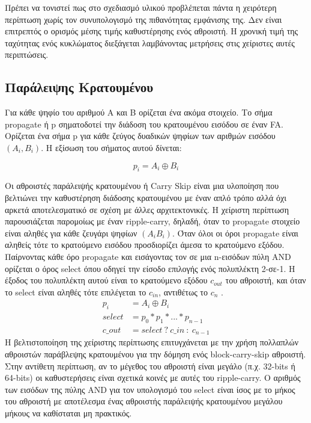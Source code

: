 Πρέπει να τονιστεί πως στο σχεδιασμό υλικού προβλέπεται πάντα η χειρότερη περίπτωση χωρίς τον συνυπολογισμό της πιθανότητας εμφάνισης της. Δεν είναι επιτρεπτός ο ορισμός μέσης τιμής καθυστέρησης ενός αθροιστή. Η χρονική τιμή της ταχύτητας ενός κυκλώματος διεξάγεται λαμβάνοντας μετρήσεις στις χείριστες αυτές περιπτώσεις. 




\subsection{Παράλειψης Κρατουμένου}
Για κάθε ψηφίο του αριθμού Α και Β ορίζεται ένα ακόμα στοιχείο. Το σήμα propagate ή p σηματοδοτεί την διάδοση του κρατουμένου εισόδου σε έναν FA. Ορίζεται ένα σήμα p για κάθε ζεύγος δυαδικών ψηφίων των αριθμών εισόδου $(A_i,B_i)$. Η εξίσωση του σήματος αυτού δίνεται:

\begin{equation}
    p_i = A_i \oplus B_i 
\end{equation}

Οι αθροιστές παράλειψής κρατουμένου ή Carry Skip είναι μια υλοποίηση που βελτιώνει την καθυστέρηση διάδοσης κρατουμένου με έναν απλό τρόπο αλλά όχι αρκετά αποτελεσματικό σε σχέση με άλλες αρχιτεκτονικές. Η χείριστη περίπτωση παρουσιάζεται παρομοίως με έναν ripple-carry, δηλαδή, όταν το propagate στοιχείο είναι αληθές για κάθε ζευγάρι ψηφίων $(A_i B_i)$. Όταν όλοι οι όροι propagate είναι αληθείς τότε το κρατούμενο εισόδου προσδιορίζει άμεσα το κρατούμενο εξόδου.
Παίρνοντας κάθε όρο propagate και εισάγοντας τον σε μια n-εισόδων πύλη AND ορίζεται ο όρος select όπου οδηγεί την είσοδο επιλογής ενός πολυπλέκτη 2-σε-1. Η έξοδος του πολυπλέκτη αυτού είναι το κρατούμενο εξόδου $c_{out}$ του αθροιστή, και όταν το select είναι αληθές τότε επιλέγεται το $c_{in}$, αντιθέτως το $c_n$ .
\begin{equation}
\begin{split}
    p_i &= A_i \oplus B_i \\
    select &= p_0 * p_1 * ... * p_{n-1} \\
    c\_out &= select\ ?\ c\_in\ :\ c_{n-1} %
\end{split}
\end{equation}
Η βελτιστοποίηση της χείριστης περίπτωσης επιτυγχάνεται με την χρήση πολλαπλών αθροιστών παράβλεψης κρατουμένου για την δόμηση ενός block-carry-skip αθροιστή. Στην αντίθετη περίπτωση, αν το μέγεθος του αθροιστή είναι μεγάλο (π.χ. 32-bits ή 64-bits) οι καθυστερήσεις είναι σχετικά κοινές με αυτές του ripple-carry. Ο αριθμός των εισόδων της πύλης AND για τον υπολογισμό του select είναι ίσος με το μήκος του αθροιστή με αποτέλεσμα ένας αθροιστής παράλειψής κρατουμένου μεγάλου μήκους να καθίσταται μη πρακτικός. 



